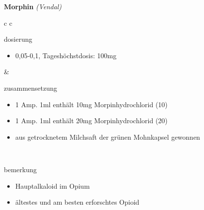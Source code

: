 \begin{frame}{
    \textbf{Morphin}
    \textit{(Vendal)}
}
    \begin{tabular}{c c}
        \begin{beamercolorbox}[wd=\boxwidth\textwidth,ht=\boxheight\textheight,sep=1em]{dosierung}
            \begin{itemize}
                \item 0,05-0,1\mgkgkg, Tageshöchstdosis: 100mg
            \end{itemize}
        \end{beamercolorbox} & 
        \begin{beamercolorbox}[wd=\boxwidth\textwidth,ht=\boxheight\textheight,sep=1em]{zusammensetzung}
            \begin{itemize}
                \item 1 Amp. 1ml enthält 10mg Morpinhydrochlorid (10\mgml)
                \item 1 Amp. 1ml enthält 20mg Morpinhydrochlorid (20\mgml)
                \item aus getrocknetem Milchsaft der grünen Mohnkapsel gewonnen
            \end{itemize}
        \end{beamercolorbox} \\
        \begin{beamercolorbox}[wd=\textwidth,ht=\boxheight\textheight,sep=1em]{bemerkung}
            \begin{itemize}
                \item Hauptalkaloid im Opium
                \item ältestes und am besten erforschtes Opioid
            \end{itemize}
        \end{beamercolorbox} \\
    \end{tabular}
\end{frame}

